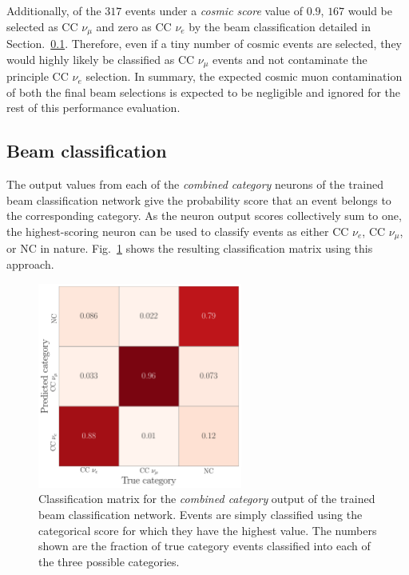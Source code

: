 Additionally, of the $317$ events under a \emph{cosmic score} value of $0.9$, $167$ would be
selected as CC $\nu_{\mu}$ and zero as CC $\nu_{e}$ by the beam classification detailed in
Section.~\ref{sec:results_eval_beam}. Therefore, even if a tiny number of cosmic events are
selected, they would highly likely be classified as CC $\nu_{\mu}$ events and not contaminate the
principle CC $\nu_{e}$ selection. In summary, the expected cosmic muon contamination of both the
final beam selections is expected to be negligible and ignored for the rest of this performance
evaluation.

\subsection{Beam classification} %
\label{sec:results_eval_beam} %

The output values from each of the \emph{combined category} neurons of the trained beam
classification network give the probability score that an event belongs to the corresponding
category. As the neuron output scores collectively sum to one, the highest-scoring neuron can be
used to classify events as either CC $\nu_{e}$, CC $\nu_{\mu}$, or NC in nature.
Fig.~\ref{fig:final_comb_cat_confusion} shows the resulting classification matrix using this
approach.

\begin{figure} %
    \includegraphics[width=0.6\textwidth]{diagrams/7-results/final_comb_cat_confusion.pdf}
    \caption[Classification matrix for the combined category output of the beam classification
        network] {Classification matrix for the \emph{combined category} output of the trained
        beam classification network. Events are simply classified using the categorical score for
        which they have the highest value. The numbers shown are the fraction of true category
        events classified into each of the three possible categories.}
    \label{fig:final_comb_cat_confusion}
\end{figure}

